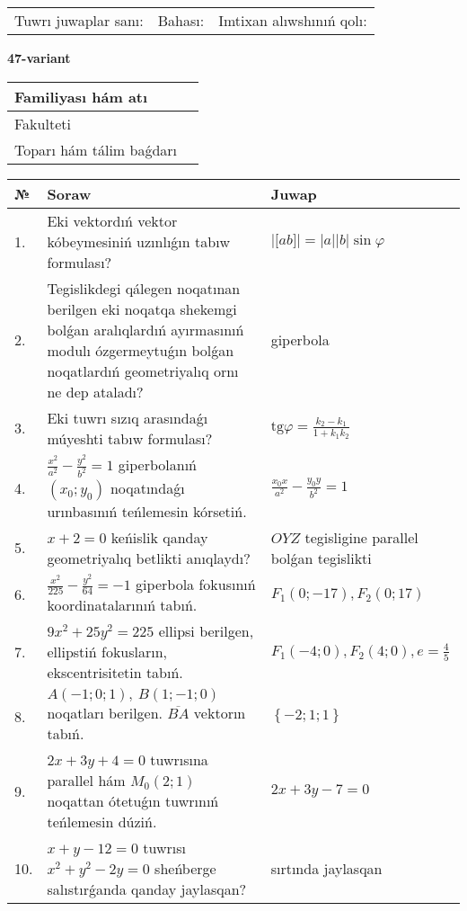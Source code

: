 \documentclass{article}
\begin{document}
\vspace{1cm}

\begin{tabular}{lll}
Tuwrı juwaplar sanı: \underline{\hspace{1.5cm}} & 
Bahası: \underline{\hspace{1.5cm}} & 
Imtixan alıwshınıń qolı: \underline{\hspace{2cm}} \\
\end{tabular}

\egroup

\newpage


\textbf{47-variant}\\

\bgroup
\def\arraystretch{1.6} %

\begin{tabular}{|m{5.7cm}|m{9.5cm}|}
\hline
Familiyası hám atı & \\
\hline
Fakulteti  & \\
\hline
Toparı hám tálim baǵdarı  & \\
\hline
\end{tabular}

\vspace{1cm}

\begin{tabular}{|m{0.7cm}|m{10cm}|m{4cm}|}
\hline
№ & Soraw & Juwap \\
\hline
1. & Eki vektordıń vektor kóbeymesiniń uzınlıǵın tabıw formulası? & $\left| \lbrack ab\rbrack \right|=|a||b|\sin\varphi$ \\
\hline
2. & Tegislikdegi qálegen noqatınan berilgen eki noqatqa shekemgi bolǵan aralıqlardıń ayırmasınıń modulı ózgermeytuǵın bolǵan noqatlardıń geometriyalıq ornı ne dep ataladı? & giperbola \\
\hline
3. & Eki tuwrı sızıq arasındaǵı múyeshti tabıw formulası? & $\text{tg}\varphi=\frac{k_2-k_1}{1+k_1k_2}$ \\
\hline
4. & $\frac{x^2}{a^2}-\frac{y^2}{b^2}=1$ giperbolanıń $(x_0;y_0)$ noqatındaǵı urınbasınıń teńlemesin kórsetiń. & $\frac{x_0x}{a^2}-\frac{y_0y}{b^2}=1$ \\
\hline
5. & $x+2=0$ keńislik qanday geometriyalıq betlikti anıqlaydı? &  $OYZ$ tegisligine parallel bolǵan tegislikti \\
\hline
6. & $\frac{x^{2}}{225}-\frac{y^{2}}{64}=-1$ giperbola fokusınıń koordinatalarınıń tabıń. & $F_{1}(0;-17), F_{2}(0;17)$ \\
\hline
7. & $9x^{2}+25y^{2}=225$ ellipsi berilgen, ellipstiń fokusların, ekscentrisitetin tabıń. & $F_1\left(-4;0 \right) , F_2\left( 4;0 \right) , e = \frac{4}{5}$ \\
\hline
8. & $A (-1;0;1),\ B (1;-1;0)$ noqatları berilgen. $\overline{BA}$ vektorın tabıń. & $\left\{ - 2;1;1 \right\}$ \\
\hline
9. & $2x+3y+4=0$ tuwrısına parallel hám $M_{0} (2;1)$ noqattan ótetuǵın tuwrınıń teńlemesin dúziń. & $2x+3y-7=0$ \\
\hline
10. & $x+y-12=0$ tuwrısı $x^{2}+y^{2}-2y=0$ sheńberge salıstırǵanda qanday jaylasqan? & sırtında jaylasqan \\
\hline
\end{tabular}
\end{document}
